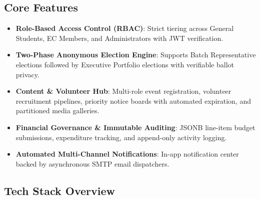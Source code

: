 \documentclass[12pt, a4paper]{article}
\begin{document}
\subsection{Core Features}
\begin{itemize}
    \item \textbf{Role-Based Access Control (RBAC)}: Strict tiering across General Students, EC Members, and Administrators with JWT verification.
    \item \textbf{Two-Phase Anonymous Election Engine}: Supports Batch Representative elections followed by Executive Portfolio elections with verifiable ballot privacy.
    \item \textbf{Content \& Volunteer Hub}: Multi-role event registration, volunteer recruitment pipelines, priority notice boards with automated expiration, and partitioned media galleries.
    \item \textbf{Financial Governance \& Immutable Auditing}: JSONB line-item budget submissions, expenditure tracking, and append-only activity logging.
    \item \textbf{Automated Multi-Channel Notifications}: In-app notification center backed by asynchronous SMTP email dispatchers.
\end{itemize}

\subsection{Tech Stack Overview}
\end{document}
